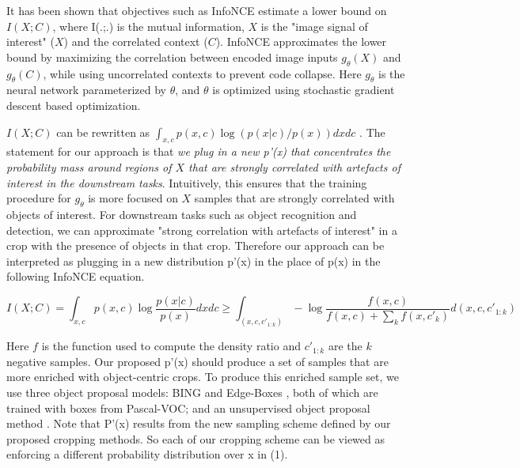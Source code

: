 It has been shown\citep{Oord2018RepresentationLW} that objectives such as InfoNCE estimate a lower bound on $I(X;C)$, where I(.;.) is the mutual information, $X$ is the  "image signal of interest" ($X$) and the correlated context ($C$). InfoNCE approximates the lower bound by maximizing the correlation between encoded image inputs $g_\theta(X)$ and $g_\theta(C)$,  while using uncorrelated contexts to prevent code collapse. Here $g_\theta$ is the neural network parameterized by $\theta$, and $\theta$ is optimized using stochastic gradient descent based optimization. 

$I(X;C)$ can be rewritten as $\int_{x,c} p(x,c) \log (p(x|c)/ p(x))dxdc$ . The statement for our approach is that \emph{we plug in a new p'(x) that concentrates the probability mass around regions of $X$ that are strongly correlated with artefacts of interest in the downstream tasks}. Intuitively, this ensures that the training procedure for $g_\theta$ is more focused on $X$ samples that are strongly correlated with objects of interest.  For downstream tasks such as object recognition and detection, we can approximate "strong correlation with artefacts of interest" in a crop with the presence of objects in that crop. Therefore our approach can be interpreted as plugging in a new distribution p'(x) in the place of p(x) in the following InfoNCE equation. 

\begin{equation}
I(X;C) =\int_{x,c} p(x,c) \log \frac{p(x|c)}{ p(x)}dxdc \geq   \int_{(x,c,c'_{1:k})} -\log \frac{f(x,c)}{f(x,c)+ \sum_k f(x,c'_k)} d(x,c,c'_{1:k})
\end{equation}

Here $f$ is the function used to compute the density ratio \citep{Oord2018RepresentationLW} and $c'_{1:k}$ are the $k$ negative samples. 
Our proposed p'(x) should produce a set of samples that are more enriched with object-centric crops. To produce this enriched sample set,  we use three object proposal models: BING \citep{Cheng2014BINGBN} and Edge-Boxes \citep{Zitnick2014EdgeBL}, both of which are trained with boxes from Pascal-VOC; and an unsupervised object proposal method \citep{vo2019unsupervised}. {Note that P’(x) results from the new sampling scheme defined by our proposed cropping methods. So each of our cropping scheme can be viewed as enforcing a different probability distribution over x in (1).}

